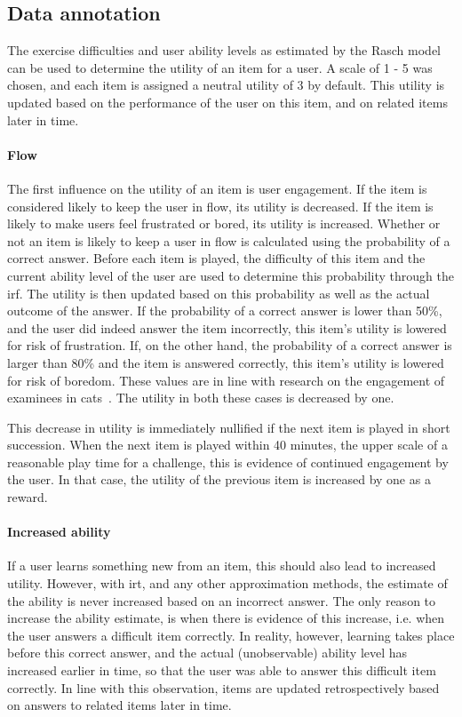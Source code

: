 \subsection{Data annotation}
\label{sec:utility}
The exercise difficulties and user ability levels as estimated by the Rasch model can be used to determine the utility of an item for a user.
A scale of 1 - 5 was chosen, and each item is assigned a neutral utility of 3 by default.
This utility is updated based on the performance of the user on this item, and on related items later in time.

\paragraph{Flow}
The first influence on the utility of an item is user engagement.
If the item is considered likely to keep the user in flow, its utility is decreased.
If the item is likely to make users feel frustrated or bored, its utility is increased.
Whether or not an item is likely to keep a user in flow is calculated using the probability of a correct answer.
Before each item is played, the difficulty of this item and the current ability level of the user are used to determine this probability through the \gls{irf}.
The utility is then updated based on this probability as well as the actual outcome of the answer.
If the probability of a correct answer is lower than 50\%, and the user did indeed answer the item incorrectly, this item's utility is lowered for risk of frustration.
If, on the other hand, the probability of a correct answer is larger than 80\% and the item is answered correctly, this item's utility is lowered for risk of boredom.
These values are in line with research on the engagement of examinees in \glspl{cat}~\cite{ling2017computerized,bolton1976handbook,moeyaert2016easy}.
The utility in both these cases is decreased by one.

This decrease in utility is immediately nullified if the next item is played in short succession.
When the next item is played within 40 minutes, the upper scale of a reasonable play time for a challenge, this is evidence of continued engagement by the user.
In that case, the utility of the previous item is increased by one as a reward.

\paragraph{Increased ability}
If a user learns something new from an item, this should also lead to increased utility.
However, with \gls{irt}, and any other approximation methods, the estimate of the ability is never increased based on an incorrect answer.
The only reason to increase the ability estimate, is when there is evidence of this increase, i.e. when the user answers a difficult item correctly.
In reality, however, learning takes place before this correct answer, and the actual (unobservable) ability level has increased earlier in time, so that the user was able to answer this difficult item correctly.
In line with this observation, items are updated retrospectively based on answers to related items later in time.

